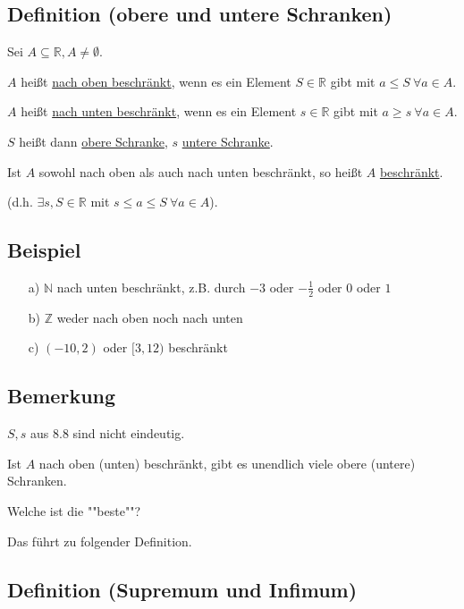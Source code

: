 \documentclass[a4paper, 12pt, twoside] {article}
\begin{document}
\subsection{Definition (obere und untere Schranken)} %

Sei $A \subseteq \mathbb{R}, A \neq \emptyset$.

$A$ heißt \uline{nach oben beschränkt}, wenn es ein Element $S \in \mathbb{R}$ gibt mit $a \leq S \  \forall a \in A$.

$A$ heißt \uline{nach unten beschränkt}, wenn es ein Element $s \in \mathbb{R}$ gibt mit $a \geq s \  \forall a \in A$.

$S$ heißt dann \uline{obere Schranke}, $s$ \uline{untere Schranke}.

Ist $A$ sowohl nach oben als auch nach unten beschränkt, so heißt $A$ \uline{beschränkt}.

(d.h. $\exists s,S \in \mathbb{R}$ mit $s \leq a \leq S \ \forall a \in A$).

\subsection{Beispiel} %

\begin{itemize}
\item[a)] $\mathbb{N}$ nach unten beschränkt, z.B. durch $-3$ oder $-\frac{1}{2}$ oder $0$ oder $1$

\item[b)] $\mathbb{Z}$ weder nach oben noch nach unten 

\item[c)] $(-10,2)$ oder $[3,12)$ beschränkt
\end{itemize}

\subsection{Bemerkung} %

$S,s$ aus 8.8 sind nicht eindeutig.

Ist $A$ nach oben (unten) beschränkt, gibt es unendlich viele obere (untere) Schranken.

Welche ist die ""beste""?

Das führt zu folgender Definition.

\subsection{Definition (Supremum und Infimum)} %
\end{document}
